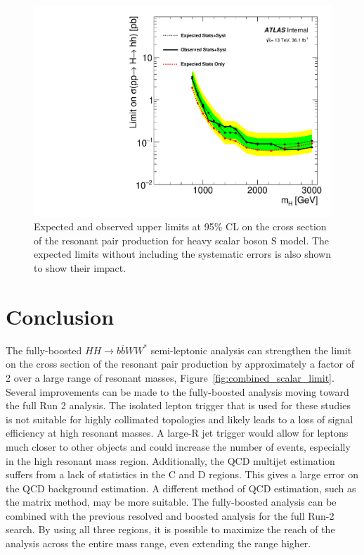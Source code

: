 \begin{figure}[h]
\begin{center}
\includegraphics[scale=0.65]{figures/Final_limits}
\caption[Expected and observed upper limits at 95\% CL on the cross section of the resonant pair production for heavy scalar boson S model]{Expected and observed upper limits at 95\% CL on the cross section of the resonant pair production for heavy scalar boson S model. The expected limits without including the systematic errors is also shown to show their impact.}
\label{fig:boosted_only_limits_new}
\end{center}
\end{figure}
\newpage

\section{Conclusion}
The fully-boosted ${HH\rightarrow b\overline{b}WW^{*}}$ semi-leptonic analysis can strengthen the limit on the cross section of the resonant pair production by approximately a factor of 2 over a large range of resonant masses, Figure~\ref{fig:combined_scalar_limit}. \newline
\indent Several improvements can be made to the fully-boosted analysis moving toward the full Run 2 analysis. The isolated lepton trigger that is used for these studies is not suitable for highly collimated topologies and likely leads to a loss of signal efficiency at high resonant masses. A large-R jet trigger would allow for leptons much closer to other objects and could increase the number of events, especially in the high resonant mass region. Additionally, the QCD multijet estimation suffers from a lack of statistics in the C and D regions. This gives a large error on the QCD background estimation. A different method of QCD estimation, such as the matrix method, may be more suitable.\newline
\indent The fully-boosted analysis can be combined with the previous resolved and boosted analysis for the full Run-2 search. By using all three regions, it is possible to maximize the reach of the analysis across the entire mass range, even extending the range higher. 

